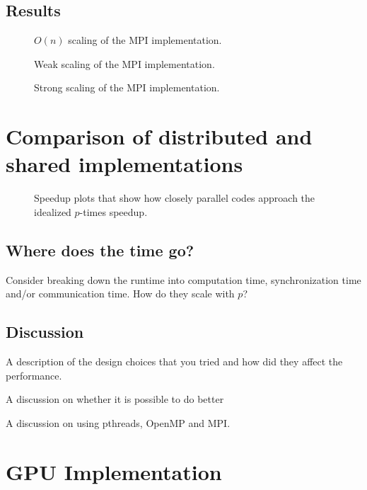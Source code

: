 \documentclass[12pt]{article}
\begin{document}
\subsection{Results}

\begin{figure}
  \caption{$O(n)$ scaling of the MPI implementation.}
  \label{fig:mpi-on}
\end{figure}

\begin{figure}
  \caption{Weak scaling of the MPI implementation.}
  \label{fig:mpi-weak}
\end{figure}

\begin{figure}
  \caption{Strong scaling of the MPI implementation.}
  \label{fig:mpi-strong}
\end{figure}

\section{Comparison of distributed and shared implementations}

\begin{figure}
  \caption{Speedup plots that show how closely parallel codes approach the idealized $p$-times speedup.}
  \label{fig:speedup}
\end{figure}

\subsection{Where does the time go?}
Consider breaking down the runtime into computation time, synchronization time and/or communication time. How do they scale with $p$?

\subsection{Discussion}

A description of the design choices that you tried and how did they affect the performance.

A discussion on whether it is possible to do better

A discussion on using pthreads, OpenMP and MPI.

\section{GPU Implementation} \label{GPU}
\end{document}
